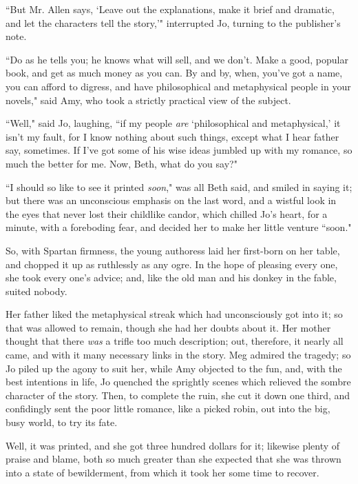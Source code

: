 ``But Mr. Allen says, `Leave out the explanations, make
it brief and dramatic, and let the characters tell the
story,'" interrupted Jo, turning to the
publisher's note.

``Do as he tells you; he knows what will sell, and we
don't. Make a good, popular book, and get as much money
as you can. By and by, when, you've got a name, you can
afford to digress, and have philosophical and metaphysical people in
your novels," said Amy, who took a strictly practical view of the
subject.

``Well," said Jo, laughing, ``if my people \emph{are}
`philosophical and metaphysical,' it
isn't my fault, for I know nothing about such things,
except what I hear father say, sometimes. If I've got
some of his wise ideas jumbled up with my romance, so much the better
for me. Now, Beth, what do you say?"

``I should so like to see it printed \emph{soon}," was all Beth said, and
smiled in saying it; but there was an unconscious emphasis on the last
word, and a wistful look in the eyes that never lost their childlike
candor, which chilled Jo's heart, for a minute, with a
foreboding fear, and decided her to make her little venture ``soon."

So, with Spartan firmness, the young authoress laid her first-born on
her table, and chopped it up as ruthlessly as any ogre. In the hope of
pleasing every one, she took every one's advice; and,
like the old man and his donkey in the fable, suited nobody.

Her father liked the metaphysical streak which had unconsciously got
into it; so that was allowed to remain, though she had her doubts about
it. Her mother thought that there \emph{was} a trifle too much
description; out, therefore, it nearly all came, and with it many
necessary links in the story. Meg admired the tragedy; so Jo piled up
the agony to suit her, while Amy objected to the fun, and, with the best
intentions in life, Jo quenched the sprightly scenes which relieved the
sombre character of the story. Then, to complete the ruin, she cut it
down one third, and confidingly sent the poor little romance, like a
picked robin, out into the big, busy world, to try its fate.

Well, it was printed, and she got three hundred dollars for it; likewise
plenty of praise and blame, both so much greater than she expected that
she was thrown into a state of bewilderment, from which it took her some
time to recover.

